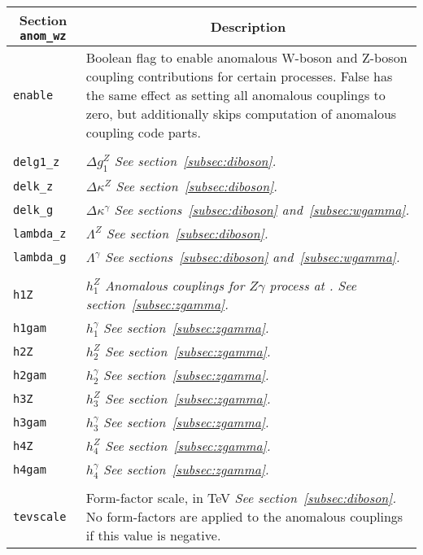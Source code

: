 	\begin{longtable}{p{1.5cm}p{12cm}}
		\toprule
		\multicolumn{1}{c}{{\textbf{Section} \texttt{anom\_wz}}} & \multicolumn{1}{c}{{\textbf{Description}}} \\ 
		\midrule
		{\tt enable} &  Boolean flag to enable anomalous W-boson and Z-boson coupling contributions for certain 
		processes. 	False has the same effect as setting all anomalous couplings to zero, but additionally skips 
		computation of anomalous coupling code parts. \\
		 & \\
		{\tt delg1\_z} & $\Delta g_1^Z$ {\it See section~\ref{subsec:diboson}.} \\
		{\tt delk\_z} & $\Delta\kappa^Z$ {\it See section~\ref{subsec:diboson}.} \\
		{\tt delk\_g} & $\Delta\kappa^\gamma$ {\it See sections~\ref{subsec:diboson} and~\ref{subsec:wgamma}.} \\
		{\tt lambda\_z} & $\Lambda^Z$ {\it See section~\ref{subsec:diboson}.} \\
		{\tt lambda\_g} & $\Lambda^\gamma$ {\it See sections~\ref{subsec:diboson} and~\ref{subsec:wgamma}.} \\
		 & \\
		{\tt h1Z} & $h_1^Z$ {\it Anomalous couplings for $Z\gamma$ process at \NNLO{}. See 
		section~\ref{subsec:zgamma}.} \\
		{\tt h1gam} & $h_1^\gamma$ {\it See section~\ref{subsec:zgamma}.} \\
		{\tt h2Z} & $h_2^Z$ {\it See section~\ref{subsec:zgamma}.} \\
		{\tt h2gam} & $h_2^\gamma$ {\it See section~\ref{subsec:zgamma}.} \\
		{\tt h3Z} & $h_3^Z$ {\it See section~\ref{subsec:zgamma}.} \\
		{\tt h3gam} & $h_3^\gamma$ {\it See section~\ref{subsec:zgamma}.} \\
		{\tt h4Z} & $h_4^Z$ {\it See section~\ref{subsec:zgamma}.} \\
		{\tt h4gam} & $h_4^\gamma$ {\it See section~\ref{subsec:zgamma}.} \\
		 & \\
		{\tt tevscale} & Form-factor scale, in TeV {\it See section~\ref{subsec:diboson}.} 
		No form-factors are applied to the anomalous couplings if this value is negative. \\
		\bottomrule
	\end{longtable}

